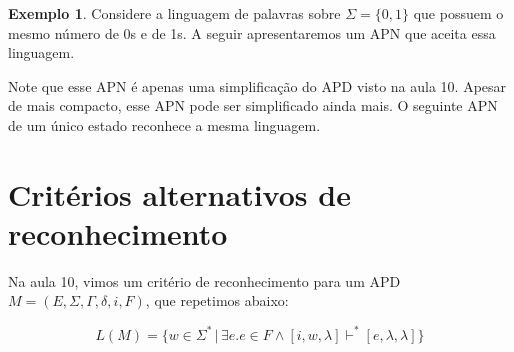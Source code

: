 \documentclass[a4paper]{article}
\theoremstyle{definition}
\newtheorem{Example}{Exemplo}
\begin{document}
  \begin{Example}
    Considere a linguagem de palavras sobre $\Sigma=\{0,1\}$ que possuem o mesmo
    número de 0s e de 1s. A seguir apresentaremos um APN que aceita essa linguagem.
    \begin{figure}[H]
      \centering
    \end{figure}
    Note que esse APN é apenas uma simplificação do APD visto na aula 10. Apesar
    de mais compacto, esse APN pode ser simplificado ainda mais. O seguinte APN
    de um único estado reconhece a mesma linguagem.
    \begin{figure}[H]
      \centering
    \end{figure}
  \end{Example}

  \section{Critérios alternativos de reconhecimento}

  Na aula 10, vimos um critério de reconhecimento para um APD $M = (E,\Sigma,\Gamma,\delta,i,F)$, que repetimos
  abaixo:

  \[
    L(M) = \{w\in\Sigma^*\,|\,\exists e. e\in F \land [i,w,\lambda]\vdash^*[e,\lambda,\lambda]\}
  \]
\end{document}
